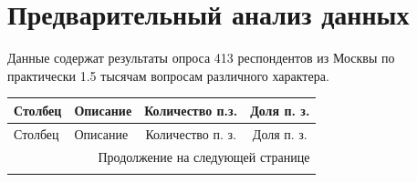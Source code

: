 \documentclass[12pt]{report}
\begin{document}
\section{Предварительный анализ данных}
Данные содержат результаты опроса 413 респондентов из Москвы по практически 1.5 тысячам вопросам различного характера. 
\begin{longtable}{llcc}
  \toprule
   Столбец &                                                                                             Описание &  Количество п.з. & Доля п. з. \\
  \midrule
  \endfirsthead
  
  \toprule
   Столбец &                                                                                             Описание &  Количество п. з. & Доля п. з. \\
  \midrule
  \endhead
  \midrule
  \multicolumn{4}{r}{{Продолжение на следующей странице}} \\
  \midrule
  \endfoot
  

\end{longtable}
\end{document}
